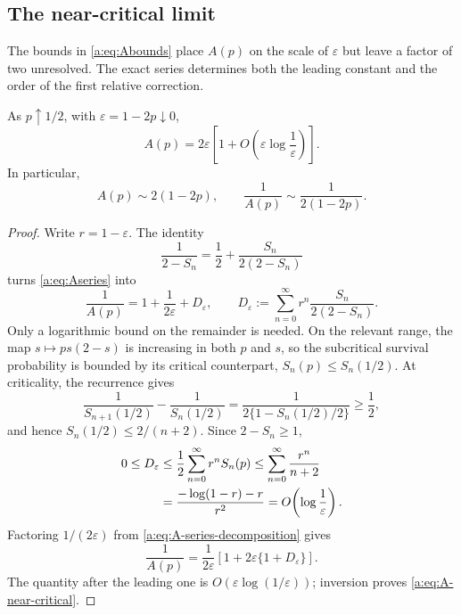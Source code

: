 \subsection{The near-critical limit}
\label{a:sec:A-near-critical}

The bounds in \cref{a:eq:Abounds} place \(A(p)\) on the scale of
\(\varepsilon\) but leave a factor of two unresolved.  The exact series determines
both the leading constant and the order of the first relative correction.

\begin{theorem}
\label{a:thm:A-near-critical}
As \(p\uparrow1/2\), with \(\varepsilon=1-2p\downarrow0\),
\begin{equation}
  A(p)=2\varepsilon
  \left[1+O\!\left(\varepsilon\log\frac1\varepsilon\right)\right].
  \label{a:eq:A-near-critical}
\end{equation}
In particular,
\begin{equation}
  A(p)\sim2(1-2p),
  \qquad
  \frac{1}{A(p)}\sim\frac{1}{2(1-2p)}.
  \label{a:eq:A-leading-asymptotic}
\end{equation}
\end{theorem}

\begin{proof}
Write \(r=1-\varepsilon\).  The identity
\begin{equation}
  \frac{1}{2-S_n}=\frac12+\frac{S_n}{2(2-S_n)}
\end{equation}
turns \cref{a:eq:Aseries} into
\begin{equation}
  \frac1{A(p)}
  =1+\frac1{2\varepsilon}+D_\varepsilon,
  \qquad
  D_\varepsilon
  :=\sum_{n=0}^{\infty}
     r^n\frac{S_n}{2(2-S_n)}.
  \label{a:eq:A-series-decomposition}
\end{equation}
Only a logarithmic bound on the remainder is needed.  On the relevant range, the
map \(s\mapsto ps(2-s)\) is increasing in both \(p\) and \(s\), so the subcritical
survival probability is bounded by its critical counterpart,
\(S_n(p)\leq S_n(1/2)\).  At criticality, the recurrence gives
\begin{equation}
  \frac1{S_{n+1}(1/2)}-\frac1{S_n(1/2)}
  =\frac{1}{2\{1-S_n(1/2)/2\}}\geq\frac12,
\end{equation}
and hence \(S_n(1/2)\leq2/(n+2)\).  Since \(2-S_n\geq1\),
\begin{align}
  0\leq D_\varepsilon
  &\leq\frac12\sum_{n=0}^{\infty}r^nS_n(p)
   \leq\sum_{n=0}^{\infty}\frac{r^n}{n+2}
  \notag\\
  &=\frac{-\log(1-r)-r}{r^2}
   =O\!\left(\log\frac1\varepsilon\right).
  \label{a:eq:D-epsilon-bound}
\end{align}
Factoring \(1/(2\varepsilon)\) from \cref{a:eq:A-series-decomposition} gives
\begin{equation}
  \frac1{A(p)}
  =\frac1{2\varepsilon}
   \left[1+2\varepsilon\{1+D_\varepsilon\}\right].
\end{equation}
The quantity after the leading one is
\(O(\varepsilon\log(1/\varepsilon))\); inversion proves
\cref{a:eq:A-near-critical}.
\end{proof}


